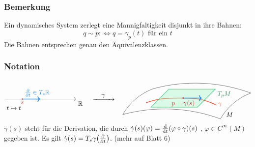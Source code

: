 \subsubsection[Bemerkung: Zerlegung von $M$ in ihre Bahnen]{Bemerkung} %
\label{ssub:255}
Ein dynamisches System zerlegt eine Mannigfaltigkeit disjunkt in ihre Bahnen:
\[
	q \sim p :\Leftrightarrow q= \gamma_p(t) \text{ für ein } t
\]
Die Bahnen entsprechen genau den Äquivalenzklassen.

\subsubsection[Notation: Derivation definiert durch eine Kurve]{Notation} %
\label{ssub:256}
\[
	\vcenter{\hbox{\begin{tikzpicture}
		\draw[->] (0,0) -- (4,0) node[below right]{$\mathds{R}$};
		\draw[very thick,DodgerBlue2, ->] (1,0) node[above right]{$\diff{}{t} \in T_s \mathds{R} $}-- (2,0);
		\draw[fill, Tomato3] (1,0) circle[radius=0.03] node[below]{$s$};
		\node[right]  at (0,-0.5) {$t \mapsto t$};
	\end{tikzpicture}}} \quad \xrightarrow{\makebox[1cm]{$\gamma$}} \quad 
	\vcenter{\hbox{\begin{tikzpicture}[scale=1.3]
		\coordinate (x) at (2.6,0.7);
		\coordinate (a) at (2.6,1.7);
		\coordinate (b) at (3.6,0.7);
		\draw (0,0) arc (105:70:7) node[above right, xshift=0.2cm]{$M$} arc (150:110:2.5) arc (70:105:7) arc (110:150:2.5) -- cycle;
		\draw[very thick, Tomato2] (1,0.5) to[out=20, in=180] (x) to[out=0, in=155]  (4,0.42) node[right]{$\gamma$};
		\draw[thick, SeaGreen3, shift=(x), fill=SeaGreen2!50, fill opacity=0.4] (1,0,1) -- ++ (0,0,-2)  -- ++ (-2,0,0) -- ++ (0,0,2) -- cycle;
		\node[below right, SeaGreen4] (A) at (3.6,0.7,-1) {$T_p M$} ;
		\draw[->, very thick, DodgerBlue2] (x) -- (3.4,0.7);
		\draw[fill=Firebrick3, Firebrick3] (x) circle[radius=0.025] node[below]{$p=\gamma(s)$};
	\end{tikzpicture}}}
\]
$\dot{\gamma}(s)$ steht für die Derivation, die durch $\dot{\gamma}(s) (\varphi) = \frac{\mathrm{d} }{\mathrm{d} t} ( \varphi \circ \gamma) (s) $ , $\varphi \in C^\infty(M)$ gegeben ist.
Es gilt $\dot{\gamma}(s) = T_s \gamma\enbrace*{\diff{}{t} } $. \hfill (mehr auf Blatt 6)

